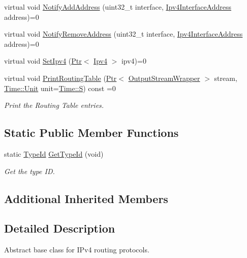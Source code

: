 \begin{DoxyCompactItemize}
\item 
virtual void \hyperlink{classns3_1_1Ipv4RoutingProtocol_aef12fcf9cc478536876b0281505d40aa}{Notify\+Add\+Address} (uint32\+\_\+t interface, \hyperlink{classns3_1_1Ipv4InterfaceAddress}{Ipv4\+Interface\+Address} address)=0
\item 
virtual void \hyperlink{classns3_1_1Ipv4RoutingProtocol_a0160e49e509d6699ec837e5485f65cd2}{Notify\+Remove\+Address} (uint32\+\_\+t interface, \hyperlink{classns3_1_1Ipv4InterfaceAddress}{Ipv4\+Interface\+Address} address)=0
\item 
virtual void \hyperlink{classns3_1_1Ipv4RoutingProtocol_af3947a05b912ea3f2a1ef0e9777f723e}{Set\+Ipv4} (\hyperlink{classns3_1_1Ptr}{Ptr}$<$ \hyperlink{classns3_1_1Ipv4}{Ipv4} $>$ ipv4)=0
\item 
virtual void \hyperlink{classns3_1_1Ipv4RoutingProtocol_a86ad3fc1d17b06b6553a13b03d7e8cb4}{Print\+Routing\+Table} (\hyperlink{classns3_1_1Ptr}{Ptr}$<$ \hyperlink{classns3_1_1OutputStreamWrapper}{Output\+Stream\+Wrapper} $>$ stream, \hyperlink{classns3_1_1Time_a87a7f4d29c68b047a72d291ad660295a}{Time\+::\+Unit} unit=\hyperlink{classns3_1_1Time_a87a7f4d29c68b047a72d291ad660295aade8622b06524a328cd3a59db6ccf76af}{Time\+::S}) const =0
\begin{DoxyCompactList}\small\item\em Print the Routing Table entries. \end{DoxyCompactList}\end{DoxyCompactItemize}
\subsection*{Static Public Member Functions}
\begin{DoxyCompactItemize}
\item 
static \hyperlink{classns3_1_1TypeId}{Type\+Id} \hyperlink{classns3_1_1Ipv4RoutingProtocol_ab0585589695505286afa12c7a1349498}{Get\+Type\+Id} (void)
\begin{DoxyCompactList}\small\item\em Get the type ID. \end{DoxyCompactList}\end{DoxyCompactItemize}
\subsection*{Additional Inherited Members}


\subsection{Detailed Description}
Abstract base class for I\+Pv4 routing protocols. 

